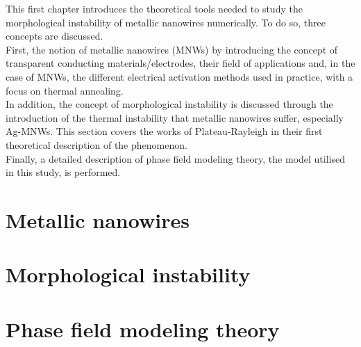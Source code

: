 This first chapter introduces the theoretical tools needed to study the morphological instability of metallic nanowires numerically. To do so, three concepts are discussed.\\
First, the notion of metallic nanowires (MNWs) by introducing the concept of transparent conducting materials/electrodes, their field of applications and, in the case of MNWs, the different electrical activation methods used in practice, with a focus on thermal annealing. \\
In addition, the concept of morphological instability is discussed through the introduction of the thermal instability that metallic nanowires suffer, especially Ag-MNWs. This section covers the works of Plateau-Rayleigh in their first theoretical description of the phenomenon. \\
Finally, a detailed description of phase field modeling theory, the model utilised in this study, is performed.
\section{Metallic nanowires}
    
\section{Morphological instability}
    

\section{Phase field modeling theory}
    
        
